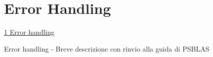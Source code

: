 \section{Error Handling}\label{sec:errors}
         {\underline{\ref{sec:errors} Error handling}}

Error handling
    - Breve descrizione con rinvio alla guida di PSBLAS

